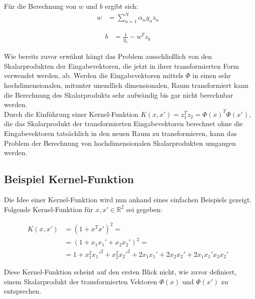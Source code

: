 \documentclass[a4paper,11pt,twoside]{scrreprt}
\begin{document}
Für die Berechnung von $w$ und $b$ ergibt sich:
\begin{equation}
	\begin{aligned}
		w &= \sum_{n=1}^{N} \alpha_{n} y_{n} z_{n}
	\end{aligned}
\end{equation}

\begin{equation}
	\begin{aligned}
		b &= \frac{1}{y_{k}} - w^{T} z_{k}
	\end{aligned}
\end{equation}

Wie bereits zuvor erwähnt hängt das Problem ausschließlich von den Skalarprodukten der Eingabevektoren, die jetzt in ihrer transformierten Form verwendet werden, ab. Werden die Eingabevektoren mittels $\Phi$ in einen sehr hochdimensionalen, mitunter unendlich dimensionalen, Raum transformiert kann die Berechnung des Skalarprodukts sehr aufwändig bis gar nicht berechnbar werden. \\

Durch die Einführung einer Kernel-Funktion $K(x, x') = z_{1}^{T} z_{2} = \Phi(x)^{T} \Phi(x')$, die das Skalarprodukt der transformierten Eingabevektoren berechnet ohne die Eingabevektoren tatsächlich in den neuen Raum zu transformieren, kann das Problem der Berechnung von hochdimensionalen Skalarprodukten umgangen werden. \\


\subsection{Beispiel Kernel-Funktion} \label{sec:example_kernel}
Die Idee einer Kernel-Funktion wird nun anhand eines einfachen Beispiels gezeigt. Folgende Kernel-Funktion für $x, x' \in \mathbb{R}^2$ sei gegeben:

\begin{equation} \label{eq:example1_kernel}
	\begin{aligned}
		K(x, x') &= (1 + x^{T}x')^{2} = \\
		&= (1 + x_{1} x_{1}' + x_{2} x_{2}')^{2} = \\
		&= 1 + x_{1}^2 x_{1}'^2 + x_{2}^{2} x_{2}'^{2} + 2x_{1} x_{1}' + 2 x_{2} x_{2}' + 2 x_{1} x_{1}'x_{2} x_{2}'
	\end{aligned}
\end{equation}

Diese Kernel-Funktion scheint auf den ersten Blick nicht, wie zuvor definiert, einem Skalarprodukt der transformierten Vektoren $\Phi(x)$ und $\Phi(x')$ zu entsprechen.\\
 
\end{document}
